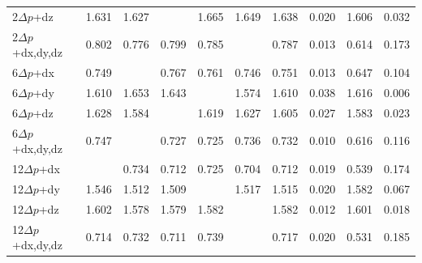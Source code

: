 \begin{table}[htbp]
\begin{tabular}{l|ccccc|cc|cc}
        2$\Delta p$+dz & 1.631 & 1.627 & \cellcolor{gray!20}{1.616} & 1.665 & 1.649 & 1.638 & 0.020 & 1.606 & 0.032 \\
        2$\Delta p$+dx,dy,dz & 0.802 & 0.776 & 0.799 & 0.785 & \cellcolor{gray!20}{0.775} & 0.787 & 0.013 & 0.614 & 0.173 \\
        6$\Delta p$+dx & 0.749 & \cellcolor{gray!20}{0.733} & 0.767 & 0.761 & 0.746 & 0.751 & 0.013 & 0.647 & 0.104 \\
        6$\Delta p$+dy & 1.610 & 1.653 & 1.643 & \cellcolor{gray!20}{1.571} & 1.574 & 1.610 & 0.038 & 1.616 & 0.006 \\
        6$\Delta p$+dz & 1.628 & 1.584 & \cellcolor{gray!20}{1.569} & 1.619 & 1.627 & 1.605 & 0.027 & 1.583 & 0.023 \\
        6$\Delta p$+dx,dy,dz & 0.747 & \cellcolor{gray!20}{0.723} & 0.727 & 0.725 & 0.736 & 0.732 & 0.010 & 0.616 & 0.116 \\
        12$\Delta p$+dx & \cellcolor{gray!20}{0.685} & 0.734 & 0.712 & 0.725 & 0.704 & 0.712 & 0.019 & 0.539 & 0.174 \\
        12$\Delta p$+dy & 1.546 & 1.512 & 1.509 & \cellcolor{gray!20}{1.491} & 1.517 & 1.515 & 0.020 & 1.582 & 0.067 \\
        12$\Delta p$+dz & 1.602 & 1.578 & 1.579 & 1.582 & \cellcolor{gray!20}{1.572} & 1.582 & 0.012 & 1.601 & 0.018 \\
        12$\Delta p$+dx,dy,dz & 0.714 & 0.732 & 0.711 & 0.739 & \cellcolor{gray!20}{0.687} & 0.717 & 0.020 & 0.531 & 0.185 \\
        \hline
        \end{tabular}
        \label{tab:robustness}
        \end{table}
